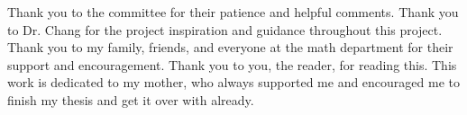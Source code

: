
Thank you to the committee for their patience and helpful comments.
Thank you to Dr. Chang for the project inspiration and guidance throughout this project.
Thank you to my family, friends, and everyone at the math department
  for their support and encouragement.
Thank you to you, the reader, for reading this.
This work is dedicated to my mother, who always supported me and encouraged me
  to finish my thesis and get it over with already.